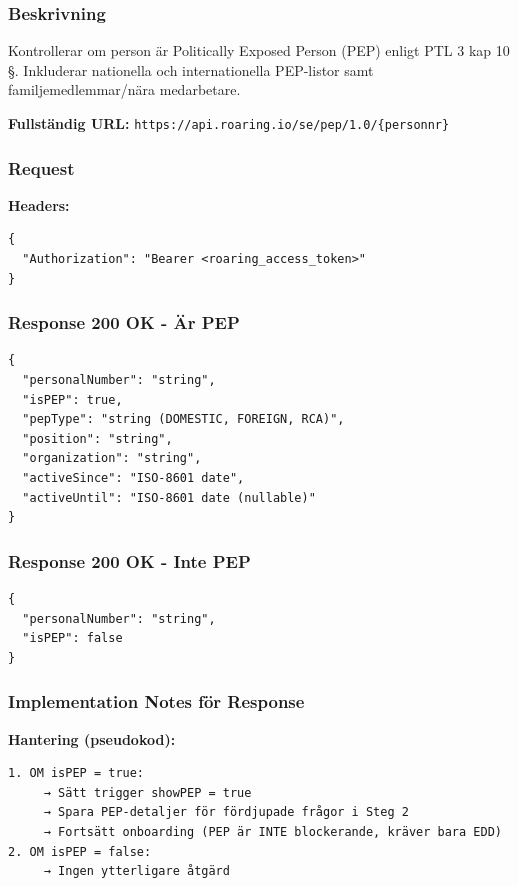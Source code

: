 \subsubsection{Beskrivning}

Kontrollerar om person är Politically Exposed Person (PEP) enligt PTL 3 kap 10 §. Inkluderar nationella och internationella PEP-listor samt familjemedlemmar/nära medarbetare.

\textbf{Fullständig URL:} \texttt{https://api.roaring.io/se/pep/1.0/\{personnr\}}

\subsubsection{Request}

\textbf{Headers:}
\begin{lstlisting}
{
  "Authorization": "Bearer <roaring_access_token>"
}
\end{lstlisting}

\subsubsection{Response 200 OK - Är PEP}

\begin{lstlisting}
{
  "personalNumber": "string",
  "isPEP": true,
  "pepType": "string (DOMESTIC, FOREIGN, RCA)",
  "position": "string",
  "organization": "string",
  "activeSince": "ISO-8601 date",
  "activeUntil": "ISO-8601 date (nullable)"
}
\end{lstlisting}

\subsubsection{Response 200 OK - Inte PEP}
\begin{lstlisting}
{
  "personalNumber": "string",
  "isPEP": false
}
\end{lstlisting}

\subsubsection{Implementation Notes för Response}

\textbf{Hantering (pseudokod):}
\begin{lstlisting}
1. OM isPEP = true:
     → Sätt trigger showPEP = true
     → Spara PEP-detaljer för fördjupade frågor i Steg 2
     → Fortsätt onboarding (PEP är INTE blockerande, kräver bara EDD)
2. OM isPEP = false:
     → Ingen ytterligare åtgärd
\end{lstlisting}

